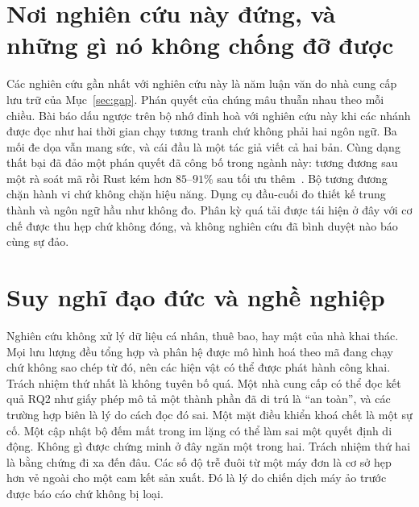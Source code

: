 \section[Nơi nghiên cứu này đứng]{Nơi nghiên cứu này đứng, và những gì nó không chống đỡ được}\label{sec:standing}
Các nghiên cứu gần nhất với nghiên cứu này là năm luận văn do nhà cung cấp lưu trữ của
Mục~\ref{sec:gap}. Phán quyết của chúng mâu thuẫn nhau theo mỗi chiều. Bài báo dấu ngược trên
bộ nhớ đỉnh hoà với nghiên cứu này khi các nhánh được đọc như hai thời gian chạy tương tranh chứ
không phải hai ngôn ngữ. Ba mối đe dọa vẫn mang sức, và cái đầu là một tác giả viết cả hai bản.
Cùng dạng thất bại đã đảo một phán quyết đã công bố trong ngành này: tương đương sau một rà soát
mã rồi Rust kém hơn $85$--$91\%$ sau tối ưu thêm~\cite{emberg2023asn1}. Bộ tương đương chặn hành
vi chứ không chặn hiệu năng. Dụng cụ đầu-cuối đo thiết kế trung thành và ngôn ngữ hầu như không
đo. Phân kỳ quá tải được tái hiện ở đây với cơ chế được thu hẹp chứ không đóng, và không nghiên
cứu đã bình duyệt nào báo cùng sự đảo.

\section{Suy nghĩ đạo đức và nghề nghiệp}
Nghiên cứu không xử lý dữ liệu cá nhân, thuê bao, hay mật của nhà khai thác. Mọi lưu lượng đều
tổng hợp và phân hệ được mô hình hoá theo mã đang chạy chứ không sao chép từ đó, nên các hiện
vật có thể được phát hành công khai. Trách nhiệm thứ nhất là không tuyên bố quá. Một nhà cung
cấp có thể đọc kết quả RQ2 như giấy phép mô tả một thành phần đã di trú là ``an toàn'', và các
trường hợp biên là lý do cách đọc đó sai. Một mặt điều khiển khoá chết là một sự cố. Một cập
nhật bộ đếm mất trong im lặng có thể làm sai một quyết định di động. Không gì được chứng minh ở
đây ngăn một trong hai. Trách nhiệm thứ hai là bằng chứng đi xa đến đâu. Các số độ trễ đuôi từ
một máy đơn là cơ sở hẹp hơn vẻ ngoài cho một cam kết sản xuất. Đó là lý do chiến dịch máy ảo
trước được báo cáo chứ không bị loại.
